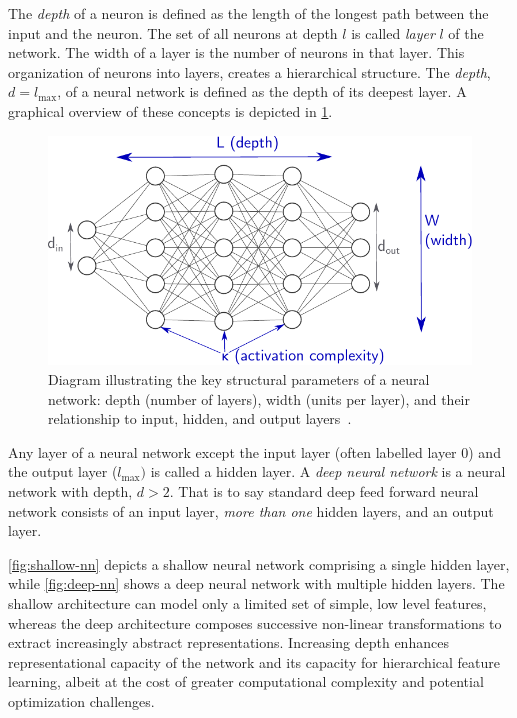             The \emph{depth} of a neuron is defined as the length of the longest path between the input and the neuron.
            The set of all neurons at depth \(l\) is called \emph{layer} \(l\) of the network.
            The width of a layer is the number of neurons in that layer.
            This organization of neurons into layers, creates a hierarchical structure.
            The \emph{depth}, \(d = l_{\max}\), of a neural network is defined as the depth of its deepest layer.
            A graphical overview of these concepts is depicted in \cref{fig:nn-concepts}.
            \begin{figure}
                \centering
                \includegraphics[width=\linewidth]{figures/chapter-03/CPWLNet_Descriptor.pdf}
                \caption[Neural network depth and width illustration]{Diagram illustrating the key structural parameters of a neural network: depth (number of layers), width (units per layer), and their relationship to input, hidden, and output layers~\cite{goujon_number_2023}.}
                \label{fig:nn-concepts}
            \end{figure}
            Any layer of a neural network except the input layer (often labelled layer \(0\)) and the output layer (\(l_{\max})\) is called a hidden layer.
            A \emph{deep neural network} is a neural network with depth, \(d > 2\).
            That is to say standard deep feed forward neural network consists of an input layer, \emph{more than one} hidden layers, and an output layer.%
            
            \cref{fig:shallow-nn} depicts a shallow neural network comprising a single hidden layer, while \cref{fig:deep-nn} shows a deep neural network with multiple hidden layers.
            The shallow architecture can model only a limited set of simple, low level features, whereas the deep architecture composes successive non-linear transformations to extract increasingly abstract representations.
            Increasing depth enhances representational capacity of the network and its capacity for hierarchical feature learning, albeit at the cost of greater computational complexity and potential optimization challenges.

